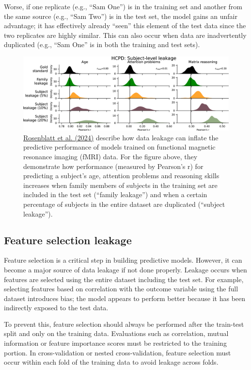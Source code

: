 \documentclass[letterpaper, 12pt]{article}
\begin{document}
Worse, if one replicate (e.g., ``Sam One'') is in the training set and another from the same source (e.g., ``Sam Two'') is in the test set, the model gains an unfair advantage; it has effectively already ``seen'' this element of the test data since the two replicates are highly similar. This can also occur when data are inadvertently duplicated (e.g., ``Sam One'' is in both the training and test sets).

\begin{figure}[h!tbp]
    \centering
    \includegraphics[width=\textwidth]{img/leakage/rosenblatt_fig_5.png}
    \caption*{\href{https://doi.org/10.1038/s41467-024-46150-w}{Rosenblatt et al. (2024)} describe how data leakage can inflate the predictive performance of models trained on functional magnetic resonance imaging (fMRI) data. For the figure above, they demonstrate how performance (measured by Pearson's r) for predicting a subject's age, attention problems and reasoning skills increases when family members of subjects in the training set are included in the test set (``family leakage'') and when a certain percentage of subjects in the entire dataset are duplicated (``subject leakage'').}
\end{figure}

\subsection*{Feature selection leakage}

Feature selection is a critical step in building predictive models. However, it can become a major source of data leakage  if not done properly. Leakage occurs when features are selected using the entire dataset including the test set. For example, selecting features based on correlation with the outcome variable using the full dataset introduces bias; the model appears to perform better because it has been indirectly exposed to the test data.

To prevent this, feature selection should always be performed after the train-test split and only on the training data. Evaluations such as correlation, mutual information or feature importance scores must be restricted to the training portion. In cross-validation or nested cross-validation, feature selection must occur within each fold of the training data to avoid leakage across folds.
\end{document}
